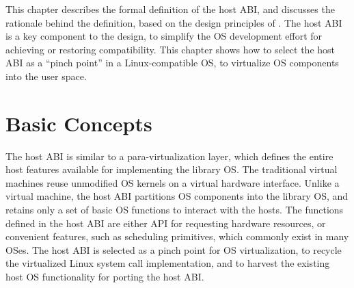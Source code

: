 This chapter describes the formal definition of the host ABI, and discusses the rationale behind the definition, based on the design principles of \graphene{}.
The host ABI is a key component
to the \graphene{} design,
to simplify the OS development effort for achieving or restoring compatibility.
This chapter shows how to select the host ABI as a ``pinch point'' in a Linux-compatible OS, to virtualize OS components into the user space.



\section{Basic Concepts}




The host ABI is similar to a para-virtualization layer, which defines the entire host features
available for implementing the library OS.
The traditional virtual machines reuse unmodified OS kernels on a virtual hardware interface.
Unlike a virtual machine,
the host ABI partitions OS components into the library OS, and retains only a set of basic OS functions to interact with the hosts.
The functions defined in the host ABI
are either API for requesting hardware resources, or convenient features, such as scheduling primitives, which commonly exist in many OSes.
The host ABI is selected as a pinch point for OS virtualization,
to recycle the virtualized Linux system call implementation, and to harvest the existing host OS functionality for porting the host ABI. 

